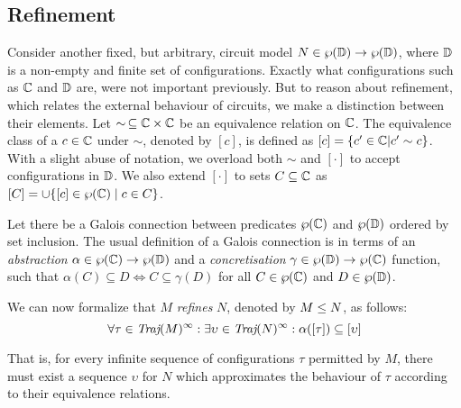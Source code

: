 \subsection{Refinement}

Consider another fixed, but arbitrary, circuit model $N \in \wp(\mathbb{D}) \rightarrow \wp(\mathbb{D})$, where $\mathbb{D}$ is a non-empty and finite set of configurations. Exactly what configurations such as $\mathbb{C}$ and $\mathbb{D}$ are, were not important previously. But to reason about refinement, which relates the external behaviour of circuits, we make a distinction between their elements. Let $\sim \, \subseteq \mathbb{C} \times \mathbb{C}$ be an equivalence relation on $\mathbb{C}$. The equivalence class of a $c \in \mathbb{C}$ under $\sim$, denoted by $[c]$, is defined as $[c] = \{ c' \in \mathbb{C} | c' \sim c \}$. With a slight abuse of notation, we overload both $\sim$ and $[\cdot]$ to accept configurations in $\mathbb{D}$. We also extend $[\cdot]$ to sets $C \subseteq \mathbb{C}$ as $[C] = \cup\{[c] \in \wp(\mathbb{C}) \mid c \in C \}$.


Let there be a Galois connection between predicates $\wp(\mathbb{C})$ and $\wp(\mathbb{D})$ ordered by set inclusion. The usual definition of a Galois connection is in terms of an \textit{abstraction} $\alpha \in \wp(\mathbb{C}) \rightarrow \wp(\mathbb{D})$ and a \textit{concretisation} $\gamma \in \wp(\mathbb{D}) \rightarrow \wp(\mathbb{C})$ function, such that $\alpha(C) \subseteq D \iff C \subseteq \gamma(D)$ for all $C \in \wp(\mathbb{C})$ and $D \in \wp(\mathbb{D})$.



We can now formalize that $M$ \textit{refines} $N$, denoted by $M \leq N$, as follows:
%
\begin{equation*}
\forall \tau \in \operatorname{\textit{Traj}}(M)^{\infty} : \exists \upsilon \in \operatorname{\textit{Traj}}(N)^{\infty} : \alpha([\tau]) \subseteq [\upsilon]
\end{equation*}

\noindent That is, for every infinite sequence of configurations $\tau$ permitted by $M$, there must exist a sequence $\upsilon$ for $N$ which approximates the behaviour of $\tau$ according to their equivalence relations.


